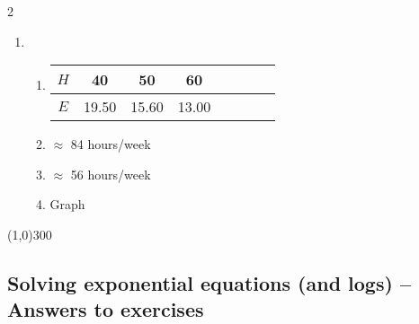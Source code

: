 \begin{multicols} {2}
\begin{enumerate}
\item %
\begin{enumerate}
\item \begin{tabular} {|c| |c|c |c|c |c|c |c|}\hline
$H$ & 40 & 50 & 60\\ \hline
$E$ &  19.50 & 15.60 & 13.00 \\ \hline
\end{tabular}
\item $\approx$ 84 hours/week
\item $\approx$ 56 hours/week
\item Graph
\end{enumerate}

\end{enumerate}
\end{multicols}

\begin{center}
\line(1,0){300} %
\end{center}

\subsection {Solving exponential equations (and logs) -- Answers to exercises} %

